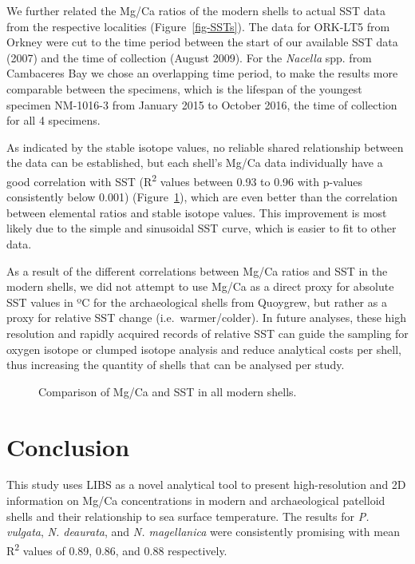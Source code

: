 \documentclass[
  authoryear,
  preprint,
  3p]{elsarticle}
\begin{document}
We further related the Mg/Ca ratios of the modern shells to actual SST
data from the respective localities (Figure~\ref{fig-SSTs}). The data
for ORK-LT5 from Orkney were cut to the time period between the start of
our available SST data (2007) and the time of collection (August 2009).
For the \emph{Nacella} spp. from Cambaceres Bay we chose an overlapping
time period, to make the results more comparable between the specimens,
which is the lifespan of the youngest specimen NM-1016-3 from January
2015 to October 2016, the time of collection for all 4 specimens.

As indicated by the stable isotope values, no reliable shared
relationship between the data can be established, but each shell's Mg/Ca
data individually have a good correlation with SST (R\textsuperscript{2}
values between 0.93 to 0.96 with p-values consistently below 0.001)
(Figure~\ref{fig-SST_Corr}), which are even better than the correlation
between elemental ratios and stable isotope values. This improvement is
most likely due to the simple and sinusoidal SST curve, which is easier
to fit to other data.

As a result of the different correlations between Mg/Ca ratios and SST
in the modern shells, we did not attempt to use Mg/Ca as a direct proxy
for absolute SST values in ºC for the archaeological shells from
Quoygrew, but rather as a proxy for relative SST change
(i.e.~warmer/colder). In future analyses, these high resolution and
rapidly acquired records of relative SST can guide the sampling for
oxygen isotope or clumped isotope analysis and reduce analytical costs
per shell, thus increasing the quantity of shells that can be analysed
per study.

\begin{figure}[H]


\caption{\label{fig-SST_Corr}Comparison of Mg/Ca and SST in all modern
shells.}

\end{figure}%

\section{Conclusion}\label{conclusion}

This study uses LIBS as a novel analytical tool to present
high-resolution and 2D information on Mg/Ca concentrations in modern and
archaeological patelloid shells and their relationship to sea surface
temperature. The results for \emph{P. vulgata}, \emph{N. deaurata}, and
\emph{N. magellanica} were consistently promising with mean
R\textsuperscript{2} values of 0.89, 0.86, and 0.88 respectively.
\end{document}
